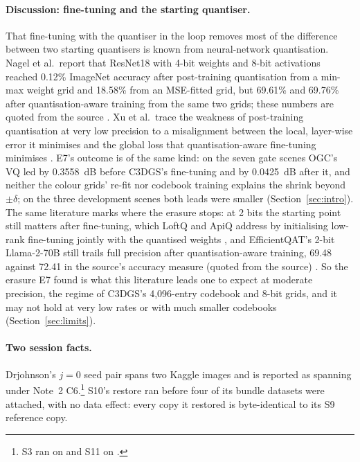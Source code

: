 \paragraph{Discussion: fine-tuning and the starting quantiser.}
That fine-tuning with the quantiser in the loop removes most of the difference between two starting quantisers is known from neural-network quantisation.
Nagel et al.\ report that ResNet18 with 4-bit weights and 8-bit activations reached 0.12\% ImageNet accuracy after post-training quantisation from a min-max weight grid and 18.58\% from an MSE-fitted grid, but 69.61\% and 69.76\% after quantisation-aware training from the same two grids; these numbers are quoted from the source \citep[Table~8]{nagel2021white}. %
Xu et al.\ trace the weakness of post-training quantisation at very low precision to a misalignment between the local, layer-wise error it minimises and the global loss that quantisation-aware fine-tuning minimises \citep{xu2025understanding}.
E7's outcome is of the same kind: on the seven gate scenes OGC's VQ led by 0.3558~dB before C3DGS's fine-tuning and by 0.0425~dB after it, and neither the colour grids' re-fit nor codebook training explains the shrink beyond $\pm\delta$; on the three development scenes both leads were smaller (Section~\ref{sec:intro}). %
The same literature marks where the erasure stops: at 2 bits the starting point still matters after fine-tuning, which LoftQ and ApiQ address by initialising low-rank fine-tuning jointly with the quantised weights \citep{li2024loftq,liao2024apiq}, and EfficientQAT's 2-bit Llama-2-70B still trails full precision after quantisation-aware training, 69.48 against 72.41 in the source's accuracy measure (quoted from the source) \citep{chen2025efficientqat}. %
So the erasure E7 found is what this literature leads one to expect at moderate precision, the regime of C3DGS's 4,096-entry codebook and 8-bit grids, and it may not hold at very low rates or with much smaller codebooks (Section~\ref{sec:limits}). %

\paragraph{Two session facts.}
Drjohnson's $j = 0$ seed pair spans two Kaggle images and is reported as spanning under Note~2 C6.\footnote{\sloppy S3 ran on  and S11 on .} %
S10's restore ran before four of its bundle datasets were attached, with no data effect: every copy it restored is byte-identical to its S9 reference copy. %

